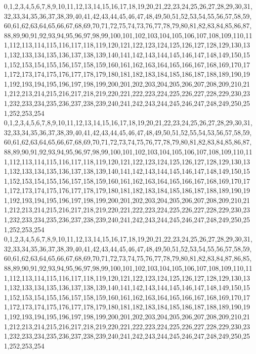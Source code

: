 \documentclass[12pt]{article}
\begin{document}
{0,1,2,3,4,5,6,7,8,9,10,11,12,13,14,15,16,17,18,19,20,21,22,23,24,25,26,27,28,29,30,31,32,33,34,35,36,37,38,39,40,41,42,43,44,45,46,47,48,49,50,51,52,53,54,55,56,57,58,59,60,61,62,63,64,65,66,67,68,69,70,71,72,75,74,73,76,77,78,79,80,81,82,83,84,85,86,87,88,89,90,91,92,93,94,95,96,97,98,99,100,101,102,103,104,105,106,107,108,109,110,111,112,113,114,115,116,117,118,119,120,121,122,123,124,125,126,127,128,129,130,131,132,133,134,135,136,137,138,139,140,141,142,143,144,145,146,147,148,149,150,151,152,153,154,155,156,157,158,159,160,161,162,163,164,165,166,167,168,169,170,171,172,173,174,175,176,177,178,179,180,181,182,183,184,185,186,187,188,189,190,191,192,193,194,195,196,197,198,199,200,201,202,203,204,205,206,207,208,209,210,211,212,213,214,215,216,217,218,219,220,221,222,223,224,225,226,227,228,229,230,231,232,233,234,235,236,237,238,239,240,241,242,243,244,245,246,247,248,249,250,251,252,253,254\\
0,1,2,3,4,5,6,7,8,9,10,11,12,13,14,15,16,17,18,19,20,21,22,23,24,25,26,27,28,29,30,31,32,33,34,35,36,37,38,39,40,41,42,43,44,45,46,47,48,49,50,51,52,55,54,53,56,57,58,59,60,61,62,63,64,65,66,67,68,69,70,71,72,73,74,75,76,77,78,79,80,81,82,83,84,85,86,87,88,89,90,91,92,93,94,95,96,97,98,99,100,101,102,103,104,105,106,107,108,109,110,111,112,113,114,115,116,117,118,119,120,121,122,123,124,125,126,127,128,129,130,131,132,133,134,135,136,137,138,139,140,141,142,143,144,145,146,147,148,149,150,151,152,153,154,155,156,157,158,159,160,161,162,163,164,165,166,167,168,169,170,171,172,173,174,175,176,177,178,179,180,181,182,183,184,185,186,187,188,189,190,191,192,193,194,195,196,197,198,199,200,201,202,203,204,205,206,207,208,209,210,211,212,213,214,215,216,217,218,219,220,221,222,223,224,225,226,227,228,229,230,231,232,233,234,235,236,237,238,239,240,241,242,243,244,245,246,247,248,249,250,251,252,253,254\\
0,1,2,3,4,5,6,7,8,9,10,11,12,13,14,15,16,17,18,19,20,21,22,23,24,25,26,27,28,29,30,31,32,33,34,35,36,37,38,39,40,41,42,43,44,45,46,47,48,49,50,51,52,53,54,55,56,57,58,59,60,61,62,63,64,65,66,67,68,69,70,71,72,73,74,75,76,77,78,79,80,81,82,83,84,87,86,85,88,89,90,91,92,93,94,95,96,97,98,99,100,101,102,103,104,105,106,107,108,109,110,111,112,113,114,115,116,117,118,119,120,121,122,123,124,125,126,127,128,129,130,131,132,133,134,135,136,137,138,139,140,141,142,143,144,145,146,147,148,149,150,151,152,153,154,155,156,157,158,159,160,161,162,163,164,165,166,167,168,169,170,171,172,173,174,175,176,177,178,179,180,181,182,183,184,185,186,187,188,189,190,191,192,193,194,195,196,197,198,199,200,201,202,203,204,205,206,207,208,209,210,211,212,213,214,215,216,217,218,219,220,221,222,223,224,225,226,227,228,229,230,231,232,233,234,235,236,237,238,239,240,241,242,243,244,245,246,247,248,249,250,251,252,253,254\\
}
\end{document}
